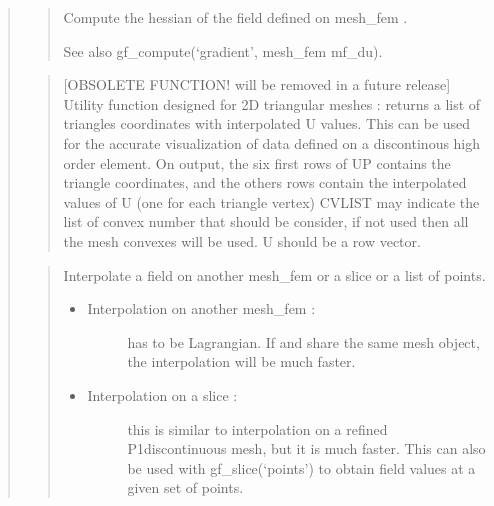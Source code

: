 \documentclass[a4paper,11pt,english]{sphinxmanual}
\begin{document}
\begin{quote}
\sphinxAtStartPar
{}
\begin{quote}

\sphinxAtStartPar
Compute the hessian of the field  defined on mesh\_fem .

\sphinxAtStartPar
See also gf\_compute(‘gradient’, mesh\_fem mf\_du).
\end{quote}

\sphinxAtStartPar
{}
\begin{quote}

\sphinxAtStartPar
{[}OBSOLETE FUNCTION! will be removed in a future release{]}
Utility function designed for 2D triangular meshes : returns a list
of triangles coordinates with interpolated U values. This can be
used for the accurate visualization of data defined on a
discontinous high order element. On output, the six first rows of UP
contains the triangle coordinates, and the others rows contain the
interpolated values of U (one for each triangle vertex) CVLIST may
indicate the list of convex number that should be consider, if not
used then all the mesh convexes will be used. U should be a row
vector.
\end{quote}

\sphinxAtStartPar
{}
\begin{quote}

\sphinxAtStartPar
Interpolate a field on another mesh\_fem or a slice or a list of points.
\begin{itemize}
\item {} \begin{description}
\item[{Interpolation on another mesh\_fem :}] \leavevmode
\sphinxAtStartPar
{} has to be Lagrangian. If  and  share the same
mesh object, the interpolation will be much faster.

\end{description}

\item {} \begin{description}
\item[{Interpolation on a slice :}] \leavevmode
\sphinxAtStartPar
this is similar to interpolation on a refined P1\sphinxhyphen{}discontinuous
mesh, but it is much faster. This can also be used with
gf\_slice(‘points’) to obtain field values at a given set of
points.


\end{description}
\end{itemize}
\end{quote}
\end{quote}
\end{document}
